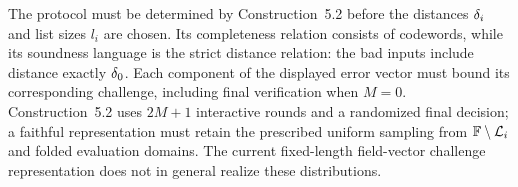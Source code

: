 \begin{remark}
The protocol must be determined by Construction~5.2 before the distances $\delta_i$ and list
sizes $l_i$ are chosen. Its completeness relation consists of codewords, while its soundness
language is the strict distance relation: the bad inputs include distance exactly $\delta_0$.
Each component of the displayed error vector must bound its corresponding challenge, including
final verification when $M=0$. Construction~5.2 uses $2M+1$ interactive rounds and a randomized
final decision; a faithful representation must retain the prescribed uniform sampling from
$\mathbb{F}\setminus\mathcal{L}_i$ and folded evaluation domains. The current fixed-length field-vector
challenge representation does not in general realize these distributions.
\end{remark}
